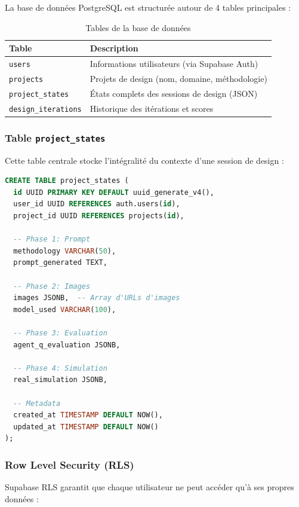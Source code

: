 La base de données PostgreSQL est structurée autour de 4 tables principales :

\begin{table}[H]
\centering
\caption{Tables de la base de données}
\label{tab:database}
\begin{tabular}{@{}lp{8cm}@{}}
\toprule
\textbf{Table} & \textbf{Description} \\ 
\midrule
\texttt{users} & Informations utilisateurs (via Supabase Auth) \\
\texttt{projects} & Projets de design (nom, domaine, méthodologie) \\
\texttt{project\_states} & États complets des sessions de design (JSON) \\
\texttt{design\_iterations} & Historique des itérations et scores \\
\bottomrule
\end{tabular}
\end{table}

\subsubsection{Table \texttt{project\_states}}

Cette table centrale stocke l'intégralité du contexte d'une session de design :

\begin{lstlisting}[language=SQL, caption=Schéma de la table project\_states]
CREATE TABLE project_states (
  id UUID PRIMARY KEY DEFAULT uuid_generate_v4(),
  user_id UUID REFERENCES auth.users(id),
  project_id UUID REFERENCES projects(id),
  
  -- Phase 1: Prompt
  methodology VARCHAR(50),
  prompt_generated TEXT,
  
  -- Phase 2: Images
  images JSONB,  -- Array d'URLs d'images
  model_used VARCHAR(100),
  
  -- Phase 3: Evaluation
  agent_q_evaluation JSONB,
  
  -- Phase 4: Simulation
  real_simulation JSONB,
  
  -- Metadata
  created_at TIMESTAMP DEFAULT NOW(),
  updated_at TIMESTAMP DEFAULT NOW()
);
\end{lstlisting}

\subsubsection{Row Level Security (RLS)}

Supabase RLS garantit que chaque utilisateur ne peut accéder qu'à ses propres données :

